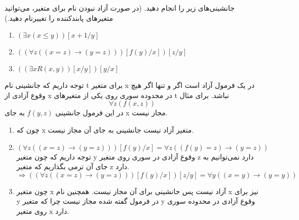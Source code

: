 
	جانشینی‌های زیر را انجام دهید. (در صورت آزاد نبودن نام برای متغیر، می‌توانید متغیرهای پابندکننده را تغییرنام دهید.)
	\begin{enumerate}[label=(\alph*)]
		\item $(\exists x (x \leq y))[x+1/y]$
		\item $((\forall z ((x = z) \rightarrow (y = z)))[f(y)/x])[z/y]$
		\item $((\exists x R(x, y))[x/y])[y/x]$
	\end{enumerate}
	\quad\vspace{0.5cm}
	\begin{ans}
		توجه داریم که جانشینی نام t برای متغیر x در یک فرمول آزاد است اگر و تنها اگر هیچ وقوع آزادی از x در محدوده سوری روی یکی از متغیر‌های t نباشد. 
		برای مثال
		$$
			\forall z(f(x, z))
		$$
		در این فرمول جانشینی 
		$
		 	f(y,z)
		$
		به جای x مجاز نیست.\\
		\begin{enumerate}[label=(\alph*)]
			\item 
			چون‌ که x متغیر آزاد نیست جانشینی به جای آن مجاز نیست.
			\item 
			$$
				(\forall z ((x = z) \rightarrow (y = z)))[f(y)/x] = \forall z ((f(y) = z) \rightarrow (y = z))
			$$
			توجه داریم که چون متغیر y وقوع آزادی در سوری روی متغیر z دارد نمی‌توانیم به جای آن ترمی بگذاریم که متغیر z دارد.
			$$
				\Longrightarrow ((\forall z ((x = z) \rightarrow (y = z)))[f(y)/x])[z/y] = 
				\forall y ((x = y) \rightarrow (y = y))
			$$
			\item
			چون متغیر x آزاد نیست پس جانشینی برای آن مجاز نیست. همچنین نام x نیز برای y در فرمول گفته شده مجاز نیست چرا که متغیر y وقوع آزادی در محدوده سوری روی متغیر x دارد.
		\end{enumerate}
	\end{ans}
